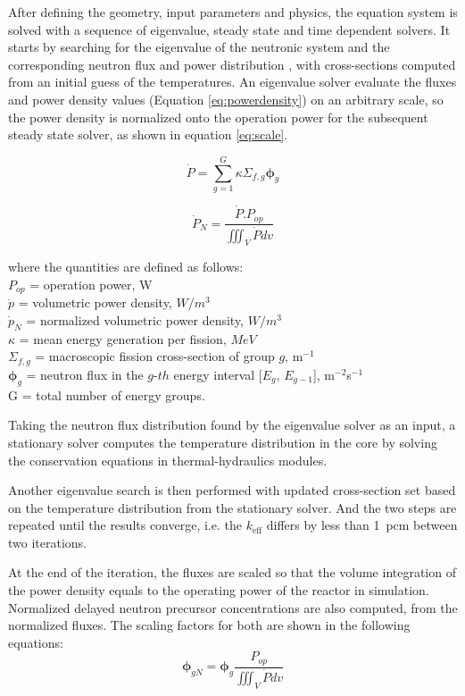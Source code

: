 \documentclass{elsarticle}
\newcommand{\keff}{{\ensuremath{k_{\mathrm{eff}}}} }
\newcommand{\flux}{{\ensuremath{\boldsymbol{\phi}}} }
\begin{document}
After defining the geometry, input parameters and physics, the equation system is solved with a sequence of eigenvalue, steady state and time dependent solvers. 
It starts by searching for the eigenvalue of the neutronic system and the corresponding neutron flux and power distribution , with cross-sections computed from an initial guess of the temperatures. An eigenvalue solver evaluate the fluxes and power density values (Equation \ref{eq:powerdensity}) on an arbitrary scale, so the power density is normalized onto the operation power for the subsequent steady state solver, as shown in equation \ref{eq:scale}.  

\begin{equation}
  \dot{P} = \sum_{g=1}^G \kappa \Sigma_{f,g} \flux _g
  \label{eq:powerdensity}
\end{equation}

\begin{equation}
  \dot{P}_N = \frac{\dot{P}.P_{op}}{\iiint_V{\dot{P}dv}}
  \label{eq:scale}
\end{equation}

where the quantities are defined as follows:\\
$P_{op}$ = operation power, W\\
$\dot{p}$ = volumetric power density, $W/m^3$\\
$\dot{p}_N$ = normalized volumetric power density, $W/m^3$\\
$\kappa$ = mean energy generation per fission, $MeV$\\
$\Sigma_{f,g}$ = macroscopic fission cross-section of group $g$, m$^{-1}$\\
$\flux_{g}$ = neutron flux in the $g$-$th$ energy interval [$E_g$, $E_{g-1}$], m$^{-2}$s$^{-1}$\\
G = total number of energy groups.
 
Taking the neutron flux distribution found by the eigenvalue solver as an input, a stationary solver computes the temperature distribution in the core by solving the conservation equations in thermal-hydraulics modules. 

Another eigenvalue search is then performed with updated cross-section set based on the temperature distribution from the stationary solver. And the two steps are repeated until the results converge, i.e. the \keff differs by less than 1~pcm between two iterations.

At the end of the iteration, the fluxes are scaled so that the volume integration of the power density equals to the operating power of the reactor in simulation. Normalized delayed neutron precursor concentrations are also computed, from the normalized fluxes. The scaling factors for both are shown in the following equations:
\begin{equation}
    \flux_{gN} = \flux_g \frac{P_{op}}{\iiint_V{\dot{P}dv}}
\end{equation}
\end{document}

